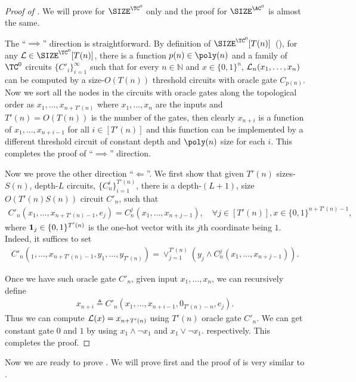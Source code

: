 \begin{proof}[Proof of ]
We will prove for $\SIZE^{\TC^0}$ only and the proof for $\SIZE^{\AC^0}$ is almost the same. 
	
The ``$\implies$'' direction is straightforward. By definition of $\SIZE^{\TC^0}[T(n)]$~(), for any $\gL\in \SIZE^{\TC^0}[T(n)]$, there is a function $p(n)\in\poly(n)$ and a family of $\TC^0$ circuits $\{C'_i\}_{i=1}^\infty$ such that for every $n\in \mathbb{N}$ and $x\in\{0,1\}^n$, ${\mathcal{L}}_n(x_1,\ldots,x_n)$ can be computed by a size-$O(T(n))$ threshold circuits with oracle gate $C_{p(n)}$. Now we sort all the nodes in the circuits with oracle gates along the topological order as $x_1,\ldots,x_{n+T'(n)}$ where $x_1,\ldots,x_n$ are the inputs and $T'(n)=O(T(n))$ is the number of the gates, then clearly $x_{n+i}$ is a function of $x_1,\ldots,x_{n+i-1}$ for all $i\in[T'(n)]$ and this function can be implemented by a different threshold circuit of constant depth and $\poly(n)$ size for each $i$. This completes the proof of ``$\implies$'' direction.
	
Now we prove the other direction ``$\Longleftarrow$''. We first show that given $T'(n)$ sizes-$S(n)$, depth-$L$ circuits, $\{C_n^{i}\}_{i=1}^{T'(n)}$, there is a depth-$(L+1)$, size $O(T'(n)S(n))$ circuit $C'_n$, such that 
\begin{align}
C'_n(x_1,\ldots, x_{n+T'(n)-1},e_{j}) = C_n^j(x_1,\ldots,x_{n+j-1}),\quad \forall j\in [T'(n)], x\in\{0,1\}^{n+T'(n)-1},
\end{align}
where ${\bm 1}_j\in\{0,1\}^{T'(n)}$ is the one-hot vector with its $j$th coordinate being $1$. Indeed, it suffices to set 
\begin{align}
	C'_n(_1,\ldots, x_{n+T'(n)-1}, y_1,\ldots, y_{T'(n)})  = \vee_{j=1}^{T'(n)} \left( y_j \wedge C_n^j(x_1,\ldots,x_{n+j-1}) \right).
\end{align}


Once we have such oracle gate $C'_n$, given input $x_1,\ldots,x_n$, we can recursively define 
\begin{align}
x_{n+i} \triangleq C'_n(x_1,\ldots, x_{n+i-1}, 0_{T'(n)-n}, e_{j}).	
\end{align}
Thus we can compute ${\mathcal{L}}(x)=x_{n+T'(n)}$ using $T'(n)$ oracle gate $C'_n$. We can get constant gate $0$ and $1$ by using $x_1 \wedge \neg x_1$ and $x_1 \vee \neg x_1$. respectively. This completes the proof. 
\end{proof}

Now we are ready to prove . We will prove  first and the proof of  is very similar to .


